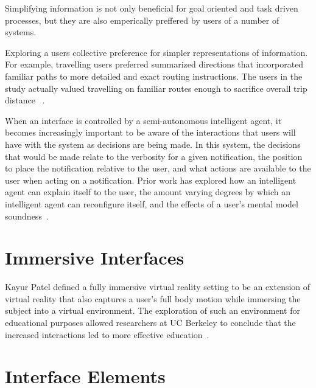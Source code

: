 Simplifying information is not only beneficial for goal oriented and task
driven processes, but they are also emperically preffered by users of a
number of systems.

Exploring a users collective preference for simpler representations of
information. For example, travelling users preferred summarized directions that incorporated familiar paths to more
detailed and exact routing instructions.  The users in the study actually
valued travelling on familiar routes enough to sacrifice overall trip distance
~\cite{patel2006personalizing}.



When an interface is controlled by a semi-autonomous intelligent agent, it
becomes increasingly important to be aware of the interactions that users will
have with the system as decisions are being made.  In this system, the
decisions that would be made relate to the verbosity for a given notification,
the position to place the notification relative to the user, and what actions
are available to the user when acting on a notification.  Prior work has
explored how an intelligent agent can explain itself to the user, the amount
varying degrees by which an intelligent agent can reconfigure itself, and the
effects of a user's mental model soundness~\cite{kulesza2012tell}.






\section{                  Immersive Interfaces                               }

Kayur Patel defined a fully immersive virtual reality setting to be an
extension of virtual reality that also captures a user's full body motion
while immersing the subject into a virtual environment.  The exploration of
such an environment for educational purposes allowed researchers at UC Berkeley
to conclude that the increased interactions led to more effective
education~\cite{patel2006effects}.






\section{                  Interface Elements                                 }
